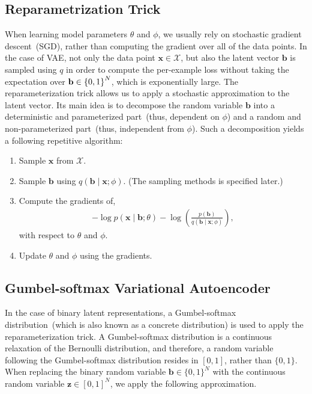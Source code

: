 \documentclass[10pt,letterpaper]{article}
\begin{document}
\subsection{Reparametrization Trick}
When learning model parameters $\theta$ and $\phi$, we usually rely on stochastic gradient descent~(SGD), rather than computing the gradient over all of the data points.
In the case of VAE, not only the data point $\mathbf{x}\in \mathcal{X}$, but also the latent vector $\mathbf{b}$ is sampled using $q$ in order to compute the per-example loss without taking the expectation over $\mathbf{b} \in {\left\{0,1\right\}}^N$, which is exponentially large.
The reparameterization trick allows us to apply a stochastic approximation to the latent vector.
Its main idea is to decompose the random variable $\mathbf{b}$ into a deterministic and parameterized part~(thus, dependent on $\phi$) and a random and non-parameterized part~(thus, independent from $\phi$).
Such a decomposition yields a following repetitive algorithm:
\begin{enumerate}
 \item Sample $\mathbf{x}$ from $\mathcal{X}$.
\item Sample $\mathbf{b}$ using $q(\mathbf{b} \mid \mathbf{x} ;\phi)$. (The sampling methods is specified later.)
 \item Compute the gradients of,
       \begin{align}
	\label{eq:stochastic-approx}
	-\log p(\mathbf{x} \mid \mathbf{b};\theta) - \log\left(\frac{p(\mathbf{b})}{q(\mathbf{b} \mid \mathbf{x};\phi)}\right),
       \end{align}
       with respect to $\theta$ and $\phi$.
 \item Update $\theta$ and $\phi$ using the gradients.
\end{enumerate}

\subsection{Gumbel-softmax Variational Autoencoder}
In the case of binary latent representations, a Gumbel-softmax distribution~(which is also known as a concrete distribution) is used to apply the reparameterization trick.
A Gumbel-softmax distribution is a continuous relaxation of the Bernoulli distribution, and therefore,
a random variable following the Gumbel-softmax distribution resides in $[0,1]$, rather than $\{0,1\}$.
When replacing the binary random variable $\mathbf{b}\in\{0,1\}^N$ with the continuous random variable $\mathbf{z}\in[0,1]^N$, we apply the following approximation.
\end{document}
